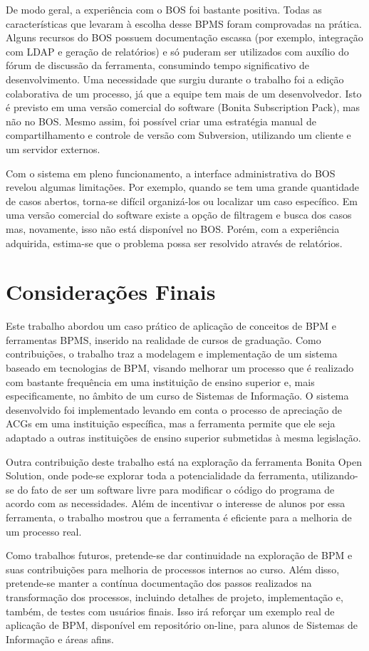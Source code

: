 \documentclass[12pt]{article}
\begin{document}
De modo geral, a experiência com o BOS foi bastante positiva. Todas as características que levaram à escolha desse BPMS foram comprovadas na prática. Alguns recursos do BOS possuem documentação escassa (por exemplo, integração com LDAP e geração de relatórios) e só puderam ser utilizados com auxílio do fórum de discussão da ferramenta, consumindo tempo significativo de desenvolvimento. Uma necessidade que surgiu durante o trabalho foi a edição colaborativa de um processo, já que a equipe tem mais de um desenvolvedor. Isto é previsto em uma versão comercial do software (Bonita Subscription Pack), mas não no BOS. Mesmo assim, foi possível criar uma estratégia manual de compartilhamento e controle de versão com Subversion, utilizando um cliente e um servidor externos.

Com o sistema em pleno funcionamento, a interface administrativa do BOS revelou algumas limitações. Por exemplo, quando se tem uma grande quantidade de casos abertos, torna-se difícil organizá-los ou localizar um caso específico. Em uma versão comercial do software existe a opção de filtragem e busca dos casos mas, novamente, isso não está disponível no BOS. Porém, com a experiência adquirida, estima-se que o problema possa ser resolvido através de relatórios.


\section{Considerações Finais}

Este trabalho abordou um caso prático de aplicação de conceitos de BPM e ferramentas BPMS, inserido na realidade de cursos de graduação. Como contribuições, o trabalho traz a modelagem e implementação de um sistema baseado em tecnologias de BPM, visando melhorar um processo que é realizado com bastante frequência em uma instituição de ensino superior e, mais especificamente, no âmbito de um curso de Sistemas de Informação. O sistema desenvolvido foi implementado levando em conta o processo de apreciação de ACGs em uma instituição específica, mas a ferramenta permite que ele seja adaptado a outras instituições de ensino superior submetidas à mesma legislação.

Outra contribuição deste trabalho está na exploração da ferramenta Bonita Open Solution, onde pode-se explorar toda a potencialidade da ferramenta, utilizando-se do fato de ser um software livre para modificar o código do programa de acordo com as necessidades. Além de incentivar o interesse de alunos por essa ferramenta, o trabalho mostrou que a ferramenta é eficiente para a melhoria de um processo real.

Como trabalhos futuros, pretende-se dar continuidade na exploração de BPM e suas contribuições para melhoria de processos internos ao curso. Além disso, pretende-se manter a contínua documentação dos passos realizados na transformação dos processos, incluindo detalhes de projeto, implementação e, também, de testes com usuários finais. Isso irá reforçar um exemplo real de aplicação de BPM, disponível em repositório on-line, para alunos de Sistemas de Informação e áreas afins.




\end{document}
